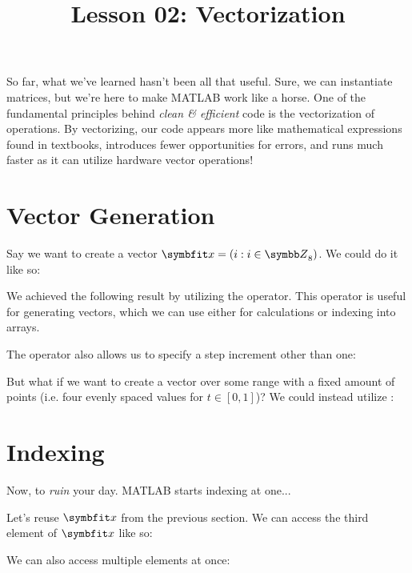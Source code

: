 \documentclass{article}
\title{Lesson 02: Vectorization}
\begin{document}
\renderTitle

So far, what we've learned hasn't been all that useful.  Sure, we can
instantiate matrices, but we're here to make MATLAB work like a horse.
One of the fundamental principles behind \emph{clean \& efficient} code
is the vectorization of operations.  By vectorizing, our code appears
more like mathematical expressions found in textbooks, introduces fewer
opportunities for errors, and runs much faster as it can utilize
hardware vector operations!

\section{Vector Generation}

Say we want to create a vector \(\mat{x} = (i : i \in \Z_8)\).  We could
do it like so:


We achieved the following result by utilizing the  operator.  This operator
is useful for generating vectors, which we can use either for
calculations or indexing into arrays.

The operator also allows us to specify a step increment other than one:


But what if we want to create a vector over some range with a fixed
amount of points (i.e. four evenly spaced values for \(t \in [0, 1]\))?
We could instead utilize :


\section{Indexing}

Now, to \emph{ruin} your day.  MATLAB starts indexing at one...

Let's reuse \(\mat{x}\) from the previous section.  We can access the
third element of \(\mat{x}\) like so:


We can also access multiple elements at once:

\end{document}
